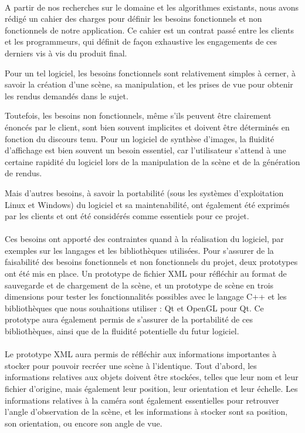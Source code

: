 \paragraph{}
        A partir de nos recherches sur le domaine et les algorithmes existants, nous avons rédigé un cahier des charges pour définir les besoins fonctionnels et non fonctionnels de notre application. Ce cahier est un contrat passé entre les clients et les programmeurs, qui définit de façon exhaustive les engagements de ces derniers vis à vis du produit final.

        Pour un tel logiciel, les besoins fonctionnels sont relativement simples à cerner, à savoir la création d'une scène, sa manipulation, et les prises de vue pour obtenir les rendus demandés dans le sujet. 
        
        Toutefois, les besoins non fonctionnels, même s'ils peuvent être clairement énoncés par le client, sont bien souvent implicites et doivent être déterminés en fonction du discours tenu. Pour un logiciel de synthèse d'images, la fluidité d'affichage est bien souvent un besoin essentiel, car l'utilisateur s'attend à une certaine rapidité du logiciel lors de la manipulation de la scène et de la génération de rendus. 
        
        Mais d'autres besoins, à savoir la portabilité (sous les systèmes d'exploitation Linux et Windows) du logiciel et sa maintenabilité, ont également été exprimés par les clients et ont été considérés comme essentiels pour ce projet.

\paragraph{}
        Ces besoins ont apporté des contraintes quand à la réalisation du logiciel, par exemples sur les langages et les bibliothèques utilisées.
        Pour s'assurer de la faisabilité des besoins fonctionnels et non fonctionnels du projet, deux prototypes ont été mis en place. Un prototype de fichier XML pour réfléchir au format de sauvegarde et de chargement de la scène, et un prototype de scène en trois dimensions pour tester les fonctionnalités possibles avec le langage C++ et les bibliothèques que nous souhaitions utiliser : Qt et OpenGL pour Qt. Ce prototype aura également permis de s'assurer de la portabilité de ces bibliothèques, ainsi que de la fluidité potentielle du futur logiciel.

\paragraph{}
        Le prototype XML aura permis de réfléchir aux informations importantes à stocker pour pouvoir recréer une scène à l'identique. Tout d'abord, les informations relatives aux objets doivent être stockées, telles que leur nom et leur fichier d'origine, mais également leur position, leur orientation et leur échelle. Les informations relatives à la caméra sont également essentielles pour retrouver l'angle d'observation de la scène, et les informations à stocker sont sa position, son orientation, ou encore son angle de vue. 
        
